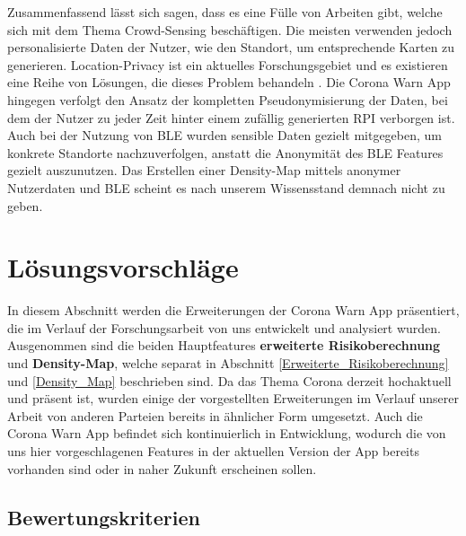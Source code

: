 \documentclass[conference,compsoc]{IEEEtran}
\begin{document}
Zusammenfassend lässt sich sagen, dass es eine Fülle von Arbeiten gibt, welche sich mit dem Thema Crowd-Sensing beschäftigen. 
Die meisten verwenden jedoch personalisierte Daten der Nutzer, wie den Standort, um entsprechende Karten zu generieren. 
Location-Privacy ist ein aktuelles Forschungsgebiet und es existieren eine Reihe von Lösungen, die dieses Problem behandeln \cite{Location}. 
Die Corona Warn App hingegen verfolgt den Ansatz der kompletten Pseudonymisierung der Daten, bei dem der Nutzer zu jeder Zeit hinter einem zufällig generierten RPI verborgen ist. 
Auch bei der Nutzung von BLE wurden sensible Daten gezielt mitgegeben, um konkrete Standorte nachzuverfolgen, anstatt die Anonymität des BLE Features gezielt auszunutzen. 
Das Erstellen einer Density-Map mittels anonymer Nutzerdaten und BLE scheint es nach unserem Wissensstand demnach nicht zu geben. 

\section{Lösungsvorschläge} \label{Nebenfeatures}
In diesem Abschnitt werden die Erweiterungen der Corona Warn App präsentiert, die im Verlauf der Forschungsarbeit von uns entwickelt und analysiert wurden. 
Ausgenommen sind die beiden Hauptfeatures \textbf{erweiterte Risikoberechnung} und \textbf{Density-Map}, welche separat in Abschnitt \ref{Erweiterte_Risikoberechnung} und \ref{Density_Map} beschrieben sind.
Da das Thema Corona derzeit hochaktuell und präsent ist, wurden einige der vorgestellten Erweiterungen im Verlauf unserer Arbeit von anderen Parteien bereits in ähnlicher Form umgesetzt.
Auch die Corona Warn App befindet sich kontinuierlich in Entwicklung, wodurch die von uns hier vorgeschlagenen Features in der aktuellen Version der App bereits vorhanden sind oder in naher Zukunft erscheinen sollen. 

\subsection{Bewertungskriterien}
\label{Bewertungskriterien}
\end{document}
